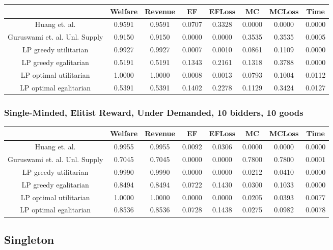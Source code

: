 \begin{tabular}{|c|c|c|c|c|c|c|c|}\hline
                            	&Welfare	&Revenue	&EF	&EFLoss	&MC	&MCLoss	&Time	\\\hline
                 Huang et. al.	&0.9591	&0.9591	&0.0707	&0.3328	&0.0000	&0.0000	&0.0000	\\\hline 
 Guruswami et. al. Unl. Supply	&0.9150	&0.9150	&0.0000	&0.0000	&0.3535	&0.3535	&0.0005	\\\hline 
         LP greedy utilitarian	&0.9927	&0.9927	&0.0007	&0.0010	&0.0861	&0.1109	&0.0000	\\\hline 
         LP greedy egalitarian	&0.5191	&0.5191	&0.1343	&0.2161	&0.1318	&0.3788	&0.0000	\\\hline 
        LP optimal utilitarian	&1.0000	&1.0000	&0.0008	&0.0013	&0.0793	&0.1004	&0.0112	\\\hline 
        LP optimal egalitarian	&0.5391	&0.5391	&0.1402	&0.2278	&0.1129	&0.3424	&0.0127	\\\hline 
\end{tabular}\subsubsection*{Single-Minded, Elitist Reward, Under Demanded, 10 bidders, 10 goods} 
\begin{tabular}{|c|c|c|c|c|c|c|c|}\hline
                            	&Welfare	&Revenue	&EF	&EFLoss	&MC	&MCLoss	&Time	\\\hline
                 Huang et. al.	&0.9955	&0.9955	&0.0092	&0.0306	&0.0000	&0.0000	&0.0000	\\\hline 
 Guruswami et. al. Unl. Supply	&0.7045	&0.7045	&0.0000	&0.0000	&0.7800	&0.7800	&0.0001	\\\hline 
         LP greedy utilitarian	&0.9990	&0.9990	&0.0000	&0.0000	&0.0212	&0.0410	&0.0000	\\\hline 
         LP greedy egalitarian	&0.8494	&0.8494	&0.0722	&0.1430	&0.0300	&0.1033	&0.0000	\\\hline 
        LP optimal utilitarian	&1.0000	&1.0000	&0.0000	&0.0000	&0.0205	&0.0393	&0.0077	\\\hline 
        LP optimal egalitarian	&0.8536	&0.8536	&0.0728	&0.1438	&0.0275	&0.0982	&0.0078	\\\hline 
\end{tabular}\newpage
\subsection{Singleton}
